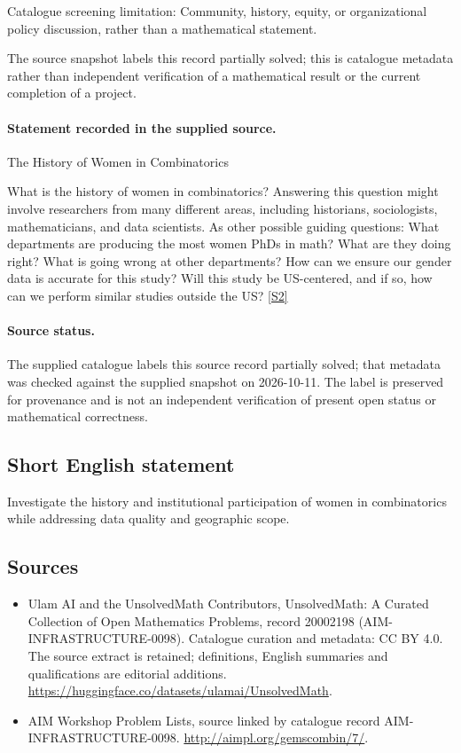 \documentclass[11pt]{article}
\begin{document}
Catalogue screening limitation: Community, history, equity, or organizational policy discussion, rather than a mathematical statement.

The source snapshot labels this record partially solved; this is catalogue metadata rather than independent verification of a mathematical result or the current completion of a project.
\paragraph{Statement recorded in the supplied source.}
The History of Women in Combinatorics

What is the history of women in combinatorics? Answering this question might involve researchers from many different areas, including historians, sociologists, mathematicians, and data scientists. As other possible guiding questions: What departments are producing the most women PhDs in math? What are they doing right? What is going wrong at other departments? How can we ensure our gender data is accurate for this study? Will this study be US-centered, and if so, how can we perform similar studies outside the US? \href{http://aimpl.org/gemscombin/7/}{[S2]}
\paragraph{Source status.}
The supplied catalogue labels this source record partially solved; that metadata was checked against the supplied snapshot on 2026-10-11. The label is preserved for provenance and is not an independent verification of present open status or mathematical correctness.
\subsection{Short English statement}
Investigate the history and institutional participation of women in combinatorics while addressing data quality and geographic scope.
\subsection{Sources}
\begin{itemize}
\item[S1] Ulam AI and the UnsolvedMath Contributors, UnsolvedMath: A Curated Collection of Open Mathematics Problems, record 20002198 (AIM-INFRASTRUCTURE-0098). Catalogue curation and metadata: CC BY 4.0. The source extract is retained; definitions, English summaries and qualifications are editorial additions.
\url{https://huggingface.co/datasets/ulamai/UnsolvedMath}.
\item[S2] AIM Workshop Problem Lists, source linked by catalogue record AIM-INFRASTRUCTURE-0098.
\url{http://aimpl.org/gemscombin/7/}.
\end{itemize}
\end{document}
